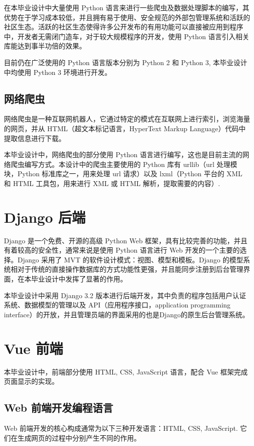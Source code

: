\documentclass[a4paper,AutoFakeBold,oneside,12pt]{book}
\begin{document}
在本毕业设计中大量使用 Python 语言来进行一些爬虫及数据处理脚本的编写，其优势在于学习成本较低，并且拥有易于使用、安全规范的外部包管理系统和活跃的社区生态。活跃的社区生态使得许多公开发布的有用功能可以直接被应用到程序中，开发者无需闭门造车，对于较大规模程序的开发，使用 Python 语言引入相关库能达到事半功倍的效果。

目前仍在广泛使用的 Python 语言版本分别为 Python 2 和 Python 3, 本毕业设计中均使用 Python 3 环境进行开发。

\subsection{网络爬虫}
网络爬虫是一种互联网机器人，它通过特定的模式在互联网上进行索引，浏览海量的网页，并从 HTML（超文本标记语言，HyperText Markup Language）代码中提取信息进行下载。\cite{web_crawler}

本毕业设计中，网络爬虫的部分使用 Python 语言进行编写，这也是目前主流的网络爬虫编写方式。本设计中的爬虫主要使用的 Python 库有 urllib（url 处理模块，Python 标准库之一，用来处理 url 请求）\cite{urllib}以及 lxml（Python 平台的 XML 和 HTML 工具包，用来进行 XML 或 HTML 解析，提取需要的内容）\cite{lxml}. 

\section{Django 后端}
Django 是一个免费、开源的高级 Python Web 框架，具有比较完善的功能，并且有着较高的安全性，通常来说是使用 Python 语言进行 Web 开发的一个主要的选择。Django 采用了 MVT 的软件设计模式：视图、模型和模板。\cite{django}\cite{django_runoob}Django 的模型系统相对于传统的直接操作数据库的方式功能性更强，并且能同步注册到后台管理界面，在本毕业设计中发挥了显著的作用。

本毕业设计中采用 Django 3.2 版本进行后端开发，其中负责的程序包括用户认证系统、数据模型的管理以及 API（应用程序接口，application programming interface）的开放，并且管理员端的界面采用的也是Django的原生后台管理系统。

\section{Vue 前端}
本毕业设计中，前端部分使用 HTML, CSS, JavaScript 语言，配合 Vue 框架完成页面显示的实现。

\subsection{Web 前端开发编程语言}
Web 前端开发的核心构成通常为以下三种开发语言：HTML, CSS, JavaScript. 它们在生成网页的过程中分别产生不同的作用。
\end{document}
